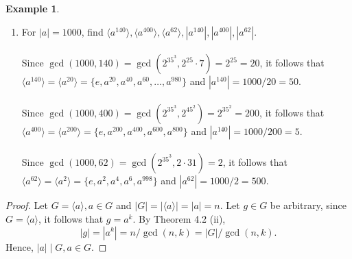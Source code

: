 \documentclass{article}
\newtheorem{corollary}{Corollary}[theorem]
\theoremstyle{definition}
\newtheorem{example}{Example}[section]
\begin{document}
\begin{example}
\begin{enumerate}
        \item For $|a|=1000$, find $\langle a^{140} \rangle, \langle a^{400} \rangle, \langle a^{62} \rangle, |a^{140}|, |a^{400}|, |a^{62}|$.
        \\ \\
        Since $\gcd(1000,140) = \gcd(2^35^3,2^25\cdot7) = 2^25 = 20$, it follows that $\langle a^{140} \rangle = \langle a^{20} \rangle = \{e,a^{20},a^{40},a^{60},\dots,a^{980}\}$ and $|a^{140}|=1000/20=50$.
        \\ \\
        Since $\gcd(1000,400) = \gcd(2^35^3,2^45^2)=2^35^2=200$, it follows that $\langle a^{400} \rangle= \langle a^{200} \rangle = \{e,a^{200},a^{400},a^{600},a^{800}\}$ and $|a^{140}|=1000/200=5$.
        \\ \\
        Since $\gcd(1000,62) = \gcd(2^35^3,2\cdot31)=2$, it follows that $\langle a^{62} \rangle = \langle a^{2} \rangle = \{e,a^2,a^4,a^6,a^{998}\}$ and $|a^{62}|=1000/2=500$.
        \\
    \end{enumerate}
    
    \noindent{}
    \begin{proof}
        Let $G = \langle a \rangle, a \in G$ and $|G| = |\langle a \rangle| = |a| = n$. Let $g \in G$ be arbitrary, since $G = \langle a \rangle$, it follows that $g = a^k$. By Theorem 4.2 (ii),
        \begin{equation*}
            |g| = |a^k| = n / \gcd(n,k) = |G| / \gcd(n,k).
        \end{equation*}
        Hence, $|a| \mid G, a \in G$.
    \end{proof}
    

\end{example}
\end{document}
